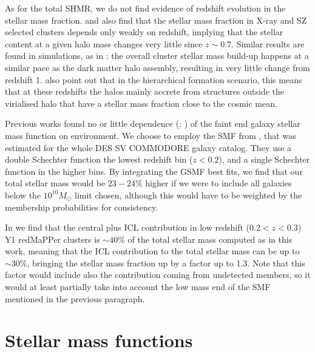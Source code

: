 {As for the total SHMR, we do not find evidence of redshift evolution in the stellar mass fraction. \citet{chiu16} and \citet{chiu17} also find that the stellar mass fraction in X-ray and SZ selected clusters depends only weakly on redshift, implying that the stellar content at a given halo mass changes very little since $z\sim 0.7$. Similar results are found in simulations, as in \citet{illustris}: the overall cluster stellar mass build-up happens at a similar pace as the dark matter halo assembly, resulting in very little change from redshift 1. \citet{chiu17} also point out that in the hierarchical formation scenario, this means that at these redshifts the halos mainly accrete from structures outside the virialised halo that have a stellar mass fraction close to the cosmic mean. 

Previous works found no or little dependence (\citealt{vulcani}; \citealt{etherington}) of the faint end galaxy stellar mass function on environment. We choose to employ the SMF from \citet{capozzi}, that was estimated for the whole DES SV COMMODORE galaxy catalog. They use a double Schechter function \citep{Schechter} the lowest redshift bin ($z<0.2$), and a single Schechter function in the higher bins. By integrating the GSMF best fits, we find that our total stellar mass would be $23-24\%$ higher if we were to include all galaxies below the $10^{10}M_\odot$ limit chosen, although this would have to be weighted by the membership probabilities for consistency.

In \citet{icl} we find that the central plus ICL contribution in low redshift ($0.2<z<0.3$) Y1 redMaPPer clusters is $\sim 40\%$ of the total stellar mass computed as in this work, meaning that the ICL contribution to the total stellar mass can be up to $\sim 30\%$, bringing the stellar mass fraction up by a factor up to 1.3. Note that this factor would include also the contribution coming from undetected members, so it would at least partially take into account the low mass end of the SMF mentioned in the previous paragraph.



\section{Stellar mass functions}\label{sec:smf}

}
